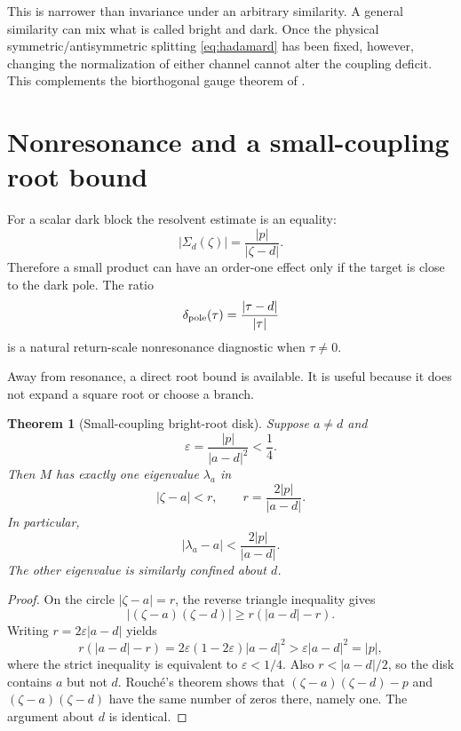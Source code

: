 \documentclass[11pt]{article}
\newtheorem{theorem}{Theorem}[section]
\theoremstyle{definition}
\theoremstyle{remark}
\begin{document}
This is narrower than invariance under an arbitrary similarity.  A general
similarity can mix what is called bright and dark.  Once the physical
symmetric/antisymmetric splitting \eqref{eq:hadamard} has been fixed,
however, changing the normalization of either channel cannot alter the
coupling deficit.  This complements the biorthogonal gauge theorem of
\citep{WangBiorthogonal2026}.

\section{Nonresonance and a small-coupling root bound}
\label{sec:bounds}

For a scalar dark block the resolvent estimate is an equality:
\begin{equation}\label{eq:scalar-resolvent-bound}
 |\Sigma_d(\zeta)|
 =\frac{|p|}{|\zeta-d|}.
\end{equation}
Therefore a small product can have an order-one effect only if the target is
close to the dark pole.  The ratio
\begin{equation}\label{eq:pole-distance-ratio}
 \delta_{\rm pole}(\tau)=\frac{|\tau-d|}{|\tau|}
\end{equation}
is a natural return-scale nonresonance diagnostic when $\tau\ne0$.

Away from resonance, a direct root bound is available.  It is useful because
it does not expand a square root or choose a branch.

\begin{theorem}[Small-coupling bright-root disk]
\label{thm:root-disk}
Suppose $a\ne d$ and
\begin{equation}\label{eq:small-coupling-parameter}
 \varepsilon=\frac{|p|}{|a-d|^2}<\frac14.
\end{equation}
Then $M$ has exactly one eigenvalue $\lambda_a$ in
\begin{equation}\label{eq:root-disk}
 |\zeta-a|<r,
 \qquad
 r=\frac{2|p|}{|a-d|}.
\end{equation}
In particular,
\begin{equation}\label{eq:root-shift-bound}
 |\lambda_a-a|<\frac{2|p|}{|a-d|}.
\end{equation}
The other eigenvalue is similarly confined about $d$.
\end{theorem}

\begin{proof}
On the circle $|\zeta-a|=r$, the reverse triangle inequality gives
\begin{equation}\label{eq:rouche-lower}
 |(\zeta-a)(\zeta-d)|
 \ge r(|a-d|-r).
\end{equation}
Writing $r=2\varepsilon|a-d|$ yields
\begin{equation}\label{eq:rouche-comparison}
 r(|a-d|-r)
 =2\varepsilon(1-2\varepsilon)|a-d|^2
 >\varepsilon|a-d|^2=|p|,
\end{equation}
where the strict inequality is equivalent to $\varepsilon<1/4$.
Also $r<|a-d|/2$, so the disk contains $a$ but not $d$.  Rouch\'e's theorem
shows that $(\zeta-a)(\zeta-d)-p$ and
$(\zeta-a)(\zeta-d)$ have the same number of zeros there, namely one.  The
argument about $d$ is identical.
\end{proof}
\end{document}
